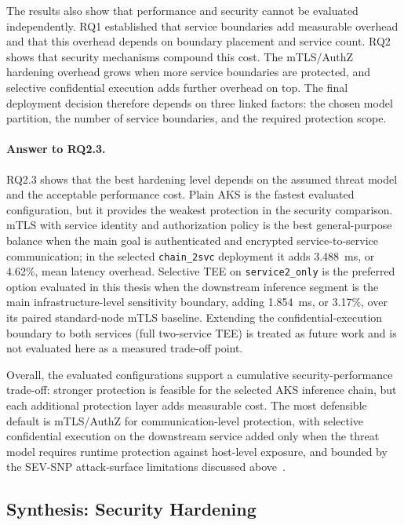 The results also show that performance and security cannot be evaluated
independently. RQ1 established that service boundaries add measurable
overhead and that this overhead depends on boundary placement and service
count. RQ2 shows that security mechanisms compound this cost. The mTLS/AuthZ
hardening overhead grows when more service boundaries are protected, and
selective confidential execution adds further overhead on top. The final
deployment decision therefore depends on three linked factors: the chosen
model partition, the number of service boundaries, and the required
protection scope.

\paragraph{Answer to RQ2.3.}
RQ2.3 shows that the best hardening level depends on the assumed threat
model and the acceptable performance cost. Plain AKS is the fastest
evaluated configuration, but it provides the weakest protection in the
security comparison. mTLS with service identity and authorization policy is
the best general-purpose balance when the main goal is authenticated and
encrypted service-to-service communication; in the selected
\texttt{chain\_2svc} deployment it adds 3.488~ms, or 4.62\%, mean latency
overhead. Selective TEE on \texttt{service2\_only} is the preferred option
evaluated in this thesis when the downstream inference segment is the main
infrastructure-level sensitivity boundary, adding 1.854~ms, or 3.17\%, over
its paired standard-node mTLS baseline. Extending the confidential-execution
boundary to both services (full two-service TEE) is treated as future work
and is not evaluated here as a measured trade-off point.

Overall, the evaluated configurations support a cumulative
security-performance trade-off: stronger protection is feasible for the
selected AKS inference chain, but each additional protection layer adds
measurable cost. The most defensible default is mTLS/AuthZ for
communication-level protection, with selective confidential execution on the
downstream service added only when the threat model requires runtime
protection against host-level exposure, and bounded by the SEV-SNP
attack-surface limitations discussed
above~\cite{schluter2024_heckler}.

\subsection{Synthesis: Security Hardening}
\label{sec:analysis-security-synthesis}

